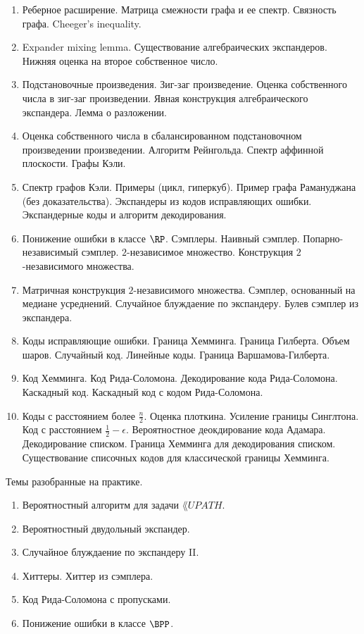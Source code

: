 \begin{enumerate}
    \item Реберное расширение. Матрица смежности графа и ее спектр. Связность графа. Cheeger's inequality.
    \item Expander mixing lemma. Существование алгебраических экспандеров. Нижняя оценка на второе собственное число.
    \item Подстановочные произведения. Зиг-заг произведение. Оценка собственного числа в зиг-заг произведении. Явная
        конструкция алгебраического экспандера. Лемма о разложении. 
    \item Оценка собственного числа в сбалансированном подстановочном произведении произведении. Алгоритм Рейнгольда. Спектр
        аффинной плоскости. Графы Кэли.
    \item Спектр графов Кэли. Примеры (цикл, гиперкуб). Пример графа Рамануджана (без доказательства). Экспандеры из кодов
        исправляющих ошибки. Экспандерные коды и алгоритм декодирования.
    \item Понижение ошибки в классе $\RP$. Сэмплеры. Наивный сэмплер. Попарно-независимый сэмплер. $2$-независимое
        множество. Конструкция $2$-независимого множества.
    \item Матричная конструкция $2$-независимого множества. Сэмплер, основанный на медиане усреднений. Случайное блуждаение
        по экспандеру. Булев сэмплер из экспандера.
    \item Коды исправляющие ошибки. Граница Хемминга. Граница Гилберта. Объем шаров. Случайный код. Линейные коды. Граница
        Варшамова-Гилберта.
    \item Код Хемминга. Код Рида-Соломона. Декодирование кода Рида-Соломона. Каскадный код. Каскадный код с кодом
        Рида-Соломона.
    \item Коды с расстоянием более $\frac{n}{2}$. Оценка плоткина. Усиление границы Синглтона. Код с расстоянием $\frac{1}{2}
        - \epsilon$. Вероятностное деокдирование кода Адамара. Декодирование списком. Граница Хемминга для декодирования
        списком. Существование списочных кодов для классической границы Хемминга.
        
\end{enumerate}

\breakline

Темы разобранные на практике.
\begin{enumerate}
    \item Вероятностный алгоритм для задачи $\lang{UPATH}$.
    \item Вероятностный двудольный экспандер.
    \item Случайное блуждаение по экспандеру II.
    \item Хиттеры. Хиттер из сэмплера.
    \item Код Рида-Соломона с пропусками.
    \item Понижение ошибки в классе $\BPP$.
\end{enumerate}